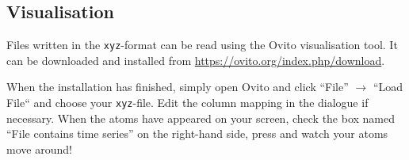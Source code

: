\documentclass[11pt,british,a4paper]{report}
\begin{document}
\tikzexternaldisable
\subsection{Visualisation}\label{app:ovito}
Files written in the \texttt{xyz}-format can be read using the Ovito visualisation tool. It can be downloaded and installed from \url{https://ovito.org/index.php/download}.

When the installation has finished, simply open Ovito and click ``File'' \(\to\) ``Load File`` and choose your \texttt{xyz}-file. Edit the column mapping in the dialogue if necessary. When the atoms have appeared on your screen, check the box named ``File contains time series'' on the right-hand side, press  and watch your atoms move around!

\end{document}
